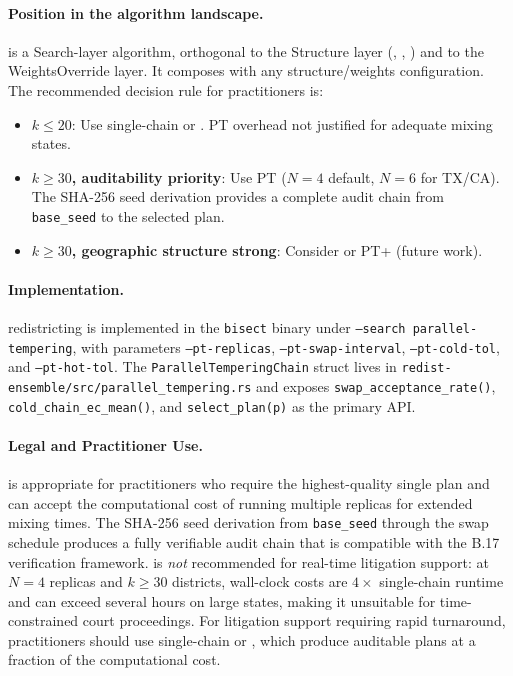 \paragraph{Position in the algorithm landscape.}
\pt{} is a Search-layer algorithm, orthogonal to the Structure layer
(\geosec{}, \ar{}, \sa{}) and to the WeightsOverride layer.
It composes with any structure/weights configuration.
The recommended decision rule for practitioners is:
\begin{itemize}
\item \textbf{$k \le 20$}: Use single-chain \fr{} or \cs{}. PT overhead not
  justified for adequate mixing states.
\item \textbf{$k \ge 30$, auditability priority}: Use PT ($N=4$ default,
  $N=6$ for TX/CA).
  The SHA-256 seed derivation provides a complete audit chain from
  \texttt{base\_seed} to the selected plan.
\item \textbf{$k \ge 30$, geographic structure strong}: Consider \ms{} or
  PT+\ms{} (future work).
\end{itemize}

\paragraph{Implementation.}
\pt{} redistricting is implemented in the \texttt{bisect} binary under
\texttt{--search parallel-tempering}, with parameters \texttt{--pt-replicas},
\texttt{--pt-swap-interval}, \texttt{--pt-cold-tol}, and \texttt{--pt-hot-tol}.
The \texttt{ParallelTemperingChain} struct lives in
\texttt{redist-ensemble/src/parallel\_tempering.rs} and exposes
\texttt{swap\_acceptance\_rate()}, \texttt{cold\_chain\_ec\_mean()},
and \texttt{select\_plan(p)} as the primary API.

\paragraph{Legal and Practitioner Use.}
\pt{} is appropriate for practitioners who require the highest-quality single
plan and can accept the computational cost of running multiple replicas for
extended mixing times.
The SHA-256 seed derivation from \texttt{base\_seed} through the swap schedule
produces a fully verifiable audit chain that is compatible with the B.17
verification framework.
\pt{} is \emph{not} recommended for real-time litigation support: at $N=4$
replicas and $k \geq 30$ districts, wall-clock costs are $4\times$ single-chain
runtime and can exceed several hours on large states, making it unsuitable for
time-constrained court proceedings.
For litigation support requiring rapid turnaround, practitioners should use
single-chain \fr{} or \cs{}, which produce auditable plans at a fraction of
the computational cost.

